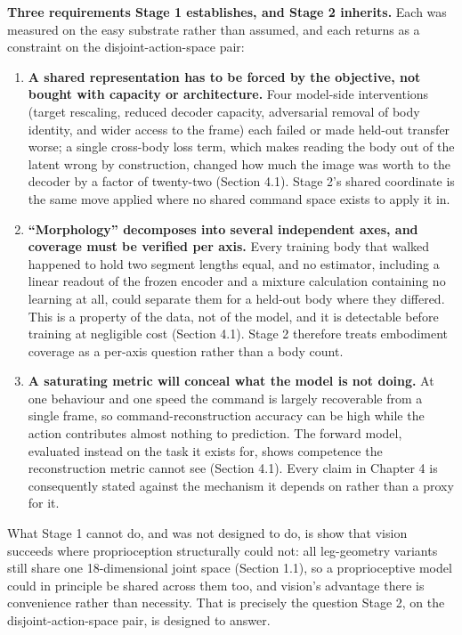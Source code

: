 \documentclass[12pt,a4paper,oneside]{report}
\begin{document}
\noindent\textbf{Three requirements Stage 1 establishes, and Stage 2 inherits.} Each was measured on the easy
substrate rather than assumed, and each returns as a constraint on the disjoint-action-space pair:

\begin{enumerate}
  \item \textbf{A shared representation has to be forced by the objective, not bought with capacity or
    architecture.} Four model-side interventions (target rescaling, reduced decoder capacity, adversarial removal
    of body identity, and wider access to the frame) each failed or made held-out transfer worse; a single
    cross-body loss term, which makes reading the body out of the latent wrong by construction, changed how much
    the image was worth to the decoder by a factor of twenty-two (Section 4.1). Stage 2's shared coordinate is the
    same move applied where no shared command space exists to apply it in.
  \item \textbf{``Morphology'' decomposes into several independent axes, and coverage must be verified per axis.}
    Every training body that walked happened to hold two segment lengths equal, and no estimator, including a
    linear readout of the frozen encoder and a mixture calculation containing no learning at all, could separate
    them for a held-out body where they differed. This is a property of the data, not of the model, and it is
    detectable before training at negligible cost (Section 4.1). Stage 2 therefore treats embodiment coverage as a
    per-axis question rather than a body count.
  \item \textbf{A saturating metric will conceal what the model is not doing.} At one behaviour and one speed the
    command is largely recoverable from a single frame, so command-reconstruction accuracy can be high while the
    action contributes almost nothing to prediction. The forward model, evaluated instead on the task it exists
    for, shows competence the reconstruction metric cannot see (Section 4.1). Every claim in Chapter 4 is
    consequently stated against the mechanism it depends on rather than a proxy for it.
\end{enumerate}

\noindent What Stage 1 cannot do, and was not designed to do, is show that vision succeeds where proprioception
structurally could not: all leg-geometry variants still share one 18-dimensional joint space (Section 1.1), so a
proprioceptive model could in principle be shared across them too, and vision's advantage there is convenience
rather than necessity. That is precisely the question Stage 2, on the disjoint-action-space pair, is designed to
answer.
\end{document}
